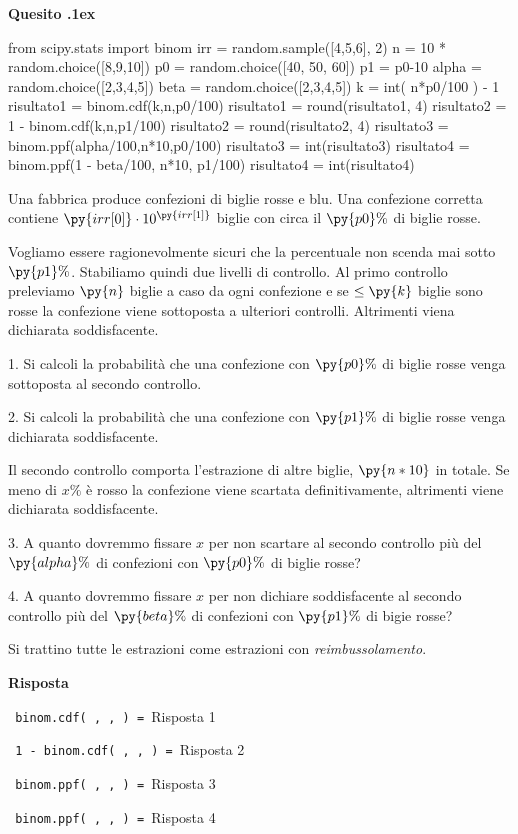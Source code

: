 \documentclass[11pt,twoside,a4paper]{article}
\newcounter{quesito}
\newenvironment{question}{\addtocounter{quesito}{1}\par\textbf{Quesito \thequesito.\kern1ex}}{\vspace{0.5\parskip}}
\newenvironment{answer}{\par\textbf{Risposta\quad}}{\vspace{\parskip}}
\begin{document}
\begin{question}
\def\Pr{{\rm Pr\,}}
\def\Ex{{\rm E\,}}
\def\Var{{\rm Var\,}}
\begin{pycode}
from scipy.stats import binom
irr = random.sample([4,5,6], 2)
n = 10 * random.choice([8,9,10])
p0 = random.choice([40, 50, 60])
p1 = p0-10
alpha =  random.choice([2,3,4,5])
beta =  random.choice([2,3,4,5])
k = int( n*p0/100 ) - 1
risultato1 = binom.cdf(k,n,p0/100)
risultato1 = round(risultato1, 4)
risultato2 = 1 - binom.cdf(k,n,p1/100)
risultato2 = round(risultato2, 4)
risultato3 = binom.ppf(alpha/100,n*10,p0/100)
risultato3 = int(risultato3)
risultato4 = binom.ppf(1 - beta/100, n*10, p1/100)
risultato4 = int(risultato4)
\end{pycode}
Una fabbrica produce confezioni di biglie rosse e blu. Una confezione corretta contiene $\py{irr[0]}\cdot 10^{\py{irr[1]}}$ biglie con circa il $\py{p0}\%$ di biglie rosse. 

Vogliamo essere ragionevolmente sicuri che la percentuale non scenda mai sotto $\py{p1}\%$.  Stabiliamo quindi due livelli di controllo. 
Al primo controllo preleviamo $\py{n}$ biglie a caso da ogni confezione e se $\le\py{k}$ biglie sono rosse la confezione viene sottoposta a ulteriori controlli. Altrimenti viena dichiarata soddisfacente.

1. Si calcoli la probabilità che una confezione con $\py{p0}\%$ di biglie rosse venga sottoposta al secondo controllo.

2. Si calcoli la probabilità che una confezione con $\py{p1}\%$ di biglie rosse venga dichiarata soddisfacente.

Il secondo controllo comporta l'estrazione di altre biglie,  $\py{n*10}$ in totale. Se meno di $x\%$ è rosso la confezione viene scartata definitivamente, altrimenti viene dichiarata soddisfacente.

3. A quanto dovremmo fissare $x$ per non scartare al secondo controllo più del $\py{alpha}\%$ di confezioni con $\py{p0}\%$ di biglie rosse?

4. A quanto dovremmo fissare $x$ per non  dichiare soddisfacente al secondo controllo più del $\py{beta}\%$ di confezioni con $\py{p1}\%$ di bigie rosse?

Si trattino tutte le estrazioni come estrazioni con \textit{reimbussolamento}.

\begin{answer}

{\tt {\color{blue} binom.cdf( , ,  )} = }\hfill  {\color{blue}Risposta 1}

{\tt {\color{blue} 1 - binom.cdf( , ,  )} = }\hfill  {\color{blue}Risposta 2}

{\tt {\color{blue} binom.ppf( , ,  )} = }\hfill  {\color{blue}Risposta 3}

{\tt {\color{blue} binom.ppf( , ,  )} = }\hfill {\color{blue}Risposta 4}

\end{answer}
\end{question}
\end{document}
